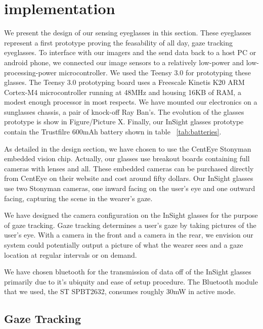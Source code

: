 \section{implementation}
\label{sec:implementation}

We present the design of our sensing eyeglasses in this section.  These eyeglasses represent a first prototype proving the feasability of all day, gaze tracking eyeglasses.  To interface with our imagers and the send data back to a host PC or android phone, we connected our image sensors to a relatively low-power and low-processing-power microcontroller.  We used the Teensy 3.0 for prototyping these glasses.  The Teensy 3.0 prototyping board uses a Freescale Kinetis K20 ARM Cortex-M4 microcontroller running at 48MHz and housing 16KB of RAM, a modest enough processor in most respects.  We have mounted our electronics on a sunglasses chassis, a pair of knock-off Ray Ban's.  The evolution of the glasses prototype is show in Figure/Picture X.  Finally, our InSight glasses prototype contain the Trustfilre 600mAh battery shown in table ~\ref{tab:batteries}.

As detailed in the design section, we have chosen to use the CentEye Stonyman embedded vision chip.  Actually, our glasses use breakout boards containing full cameras with lenses and all.  These embedded cameras can be purchased directly from CentEye on their website and cost around fifty dollars.  Our InSight glasses use two Stonyman cameras, one inward facing on the user's eye and one outward facing, capturing the scene in the wearer's gaze.

We have designed the camera configuration on the InSight glasses for the purpose of gaze tracking.  Gaze tracking determines a user's gaze by taking pictures of the user's eye.  With a camera in the front and a camera in the rear, we envision our system could potentially output a picture of what the wearer sees and a gaze location at regular intervals or on demand.


We have chosen bluetooth for the transmission of data off of the InSight glasses primarily due to it's ubiquity and ease of setup procedure.  The Bluetooth module that we used, the ST SPBT2632, consumes roughly 30mW in active mode.

\subsection{Gaze Tracking}

